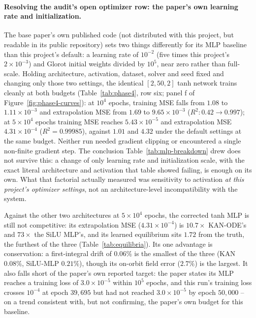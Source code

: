 \paragraph{Resolving the audit's open optimizer row: the paper's own learning
rate and initialization.} The base paper's own published code (not
distributed with this project, but readable in its public repository) sets
two things differently for its MLP baseline than this project's default: a
learning rate of $10^{-2}$ (five times this project's $2\times10^{-3}$) and
Glorot initial weights divided by $10^5$, near zero rather than full-scale.
Holding architecture, activation, dataset, solver and seed fixed and
changing only those two settings, the identical $[2,50,2]$ tanh network
trains cleanly at both budgets (Table~\ref{tab:phase4}, row six; panel f of
Figure~\ref{fig:phase4-curves}): at $10^4$ epochs, training MSE falls from
$1.08$ to $1.11\times10^{-3}$ and extrapolation MSE from $1.69$ to
$9.65\times10^{-3}$ ($R^2:0.42\to0.997$); at $5\times10^4$ epochs training
MSE reaches $5.43\times10^{-5}$ and extrapolation MSE $4.31\times10^{-4}$
($R^2=0.99985$), against $1.01$ and $4.32$ under the default settings at the
same budget. Neither run needed gradient clipping or encountered a single
non-finite gradient step. The conclusion Table~\ref{tab:mlp-breakdown} drew
does not survive this: a change of only learning rate and initialization
scale, with the exact literal architecture and activation that table showed
failing, is enough on its own. What that factorial actually measured was
sensitivity to activation \emph{at this project's optimizer settings}, not an
architecture-level incompatibility with the system.

Against the other two architectures at $5\times10^4$ epochs, the corrected
tanh MLP is still not competitive: its extrapolation MSE
($4.31\times10^{-4}$) is $10.7\times$ KAN-ODE's and $73\times$ the SiLU MLP's,
and its learned equilibrium sits $1.72$ from the truth, the furthest of the
three (Table~\ref{tab:equilibria}). Its one advantage is conservation: a
first-integral drift of $0.06\%$ is the smallest of the three (KAN $0.08\%$,
SiLU-MLP $0.21\%$), though its on-orbit field error ($2.7\%$) is the
largest. It also falls short of the paper's own reported target: the paper
states its MLP reaches a training loss of $3.0\times10^{-5}$ within $10^5$
epochs, and this run's training loss crosses $10^{-4}$ at epoch $39{,}695$
but had not reached $3.0\times10^{-5}$ by epoch $50{,}000$ -- on a trend
consistent with, but not confirming, the paper's own budget for this
baseline.

